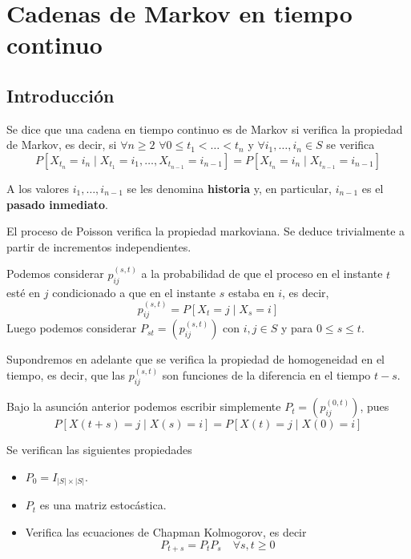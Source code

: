 \documentclass[PREyA.tex]{subfiles}
\begin{document}
\chapter{Cadenas de Markov en tiempo continuo}
\section{Introducción}
\begin{defi}
Se dice que una cadena en tiempo continuo es de Markov si verifica la propiedad de Markov, es decir, si $\forall n \geq 2$ $\forall 0\leq t_1 < \dotsc < t_n$ y $\forall i_1,\dotsc,i_n\in S$ se verifica
$$
P[X_{t_n} = i_n \mid X_{t_1}=i_1,\dotsc,X_{t_{n-1}}=i_{n-1}] = P[X_{t_n} = i_n \mid X_{t_{n-1}} = i_{n-1}]
$$
\end{defi}
\begin{defi}
A los valores $i_1,\dotsc,i_{n-1}$ se les denomina \textbf{historia} y, en particular, $i_{n-1}$ es el \textbf{pasado inmediato}.
\end{defi}
\begin{example}
El proceso de Poisson verifica la propiedad markoviana. Se deduce trivialmente a partir de incrementos independientes.
\end{example}
\begin{defi}
Podemos considerar $p_{ij}^{(s,t)}$ a la probabilidad de que el proceso en el instante $t$ esté en $j$ condicionado a que en el instante $s$ estaba en $i$, es decir,
$$
p_{ij}^{(s,t)} = P[X_t =j \mid X_s = i]
$$
Luego podemos considerar $P_{st} = (p_{ij}^{(s,t)})$ con $i,j \in S$ y para $0\leq s \leq t$.
\end{defi}
\begin{nota}
Supondremos en adelante que se verifica la propiedad de homogeneidad en el tiempo, es decir, que las $p_{ij}^{(s,t)}$ son funciones de la diferencia en el tiempo $t-s$. 
\end{nota}
\begin{nota}
Bajo la asunción anterior podemos escribir simplemente $P_t = (p_{ij}^{(0,t)})$, pues
$$
P[X(t+s)=j \mid X(s)=i] = P[X(t)=j\mid X(0)=i]
$$
\end{nota}
\newpage
\begin{prop}
Se verifican las siguientes propiedades
\begin{itemize}
\item $P_0 = I_{|S|\times |S|}$.
\item $P_t$ es una matriz estocástica.
\item Verifica las ecuaciones de Chapman Kolmogorov, es decir
$$
P_{t+s}=P_tP_s \quad \forall s,t\geq 0
$$
\end{itemize}
\end{prop}
\end{document}
